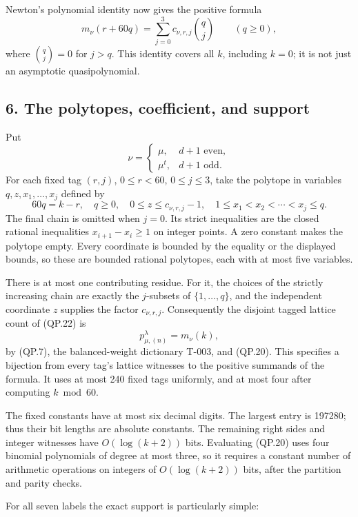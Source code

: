 \documentclass[
  10pt,
]{article}
\begin{document}
Newton's polynomial identity now gives the positive formula \[
\boxed{
m_\nu(r+60q)=\sum_{j=0}^3 c_{\nu,r,j}\binom qj
\qquad(q\ge0),}
\tag{QP.20}
\] where \(\binom qj=0\) for \(j>q\). This identity covers all \(k\),
including \(k=0\); it is not just an asymptotic quasipolynomial.

\subsection{6. The polytopes, coefficient, and
support}\label{the-polytopes-coefficient-and-support}

Put \[
\nu=\begin{cases}\mu,&d+1\text{ even},\\\mu^t,&d+1\text{ odd}.
\end{cases}
\tag{QP.21}
\] For each fixed tag \((r,j)\), \(0\le r<60\), \(0\le j\le3\), take the
polytope in variables \(q,z,x_1,\ldots,x_j\) defined by \[
\boxed{
60q=k-r,\quad q\ge0,\quad
0\le z\le c_{\nu,r,j}-1,\quad
1\le x_1<x_2<\cdots<x_j\le q.}
\tag{QP.22}
\] The final chain is omitted when \(j=0\). Its strict inequalities are
the closed rational inequalities \(x_{i+1}-x_i\ge1\) on integer points.
A zero constant makes the polytope empty. Every coordinate is bounded by
the equality or the displayed bounds, so these are bounded rational
polytopes, each with at most five variables.

There is at most one contributing residue. For it, the choices of the
strictly increasing chain are exactly the \(j\)-subsets of
\(\{1,\ldots,q\}\), and the independent coordinate \(z\) supplies the
factor \(c_{\nu,r,j}\). Consequently the disjoint tagged lattice count
of (QP.22) is \[
\boxed{p_{\mu,(n)}^\lambda=m_\nu(k),}
\tag{QP.23}
\] by (QP.7), the balanced-weight dictionary T-003, and (QP.20). This
specifies a bijection from every tag's lattice witnesses to the positive
summands of the formula. It uses at most 240 fixed tags uniformly, and
at most four after computing \(k\bmod60\).

The fixed constants have at most six decimal digits. The largest entry
is 197280; thus their bit lengths are absolute constants. The remaining
right sides and integer witnesses have \(O(\log(k+2))\) bits. Evaluating
(QP.20) uses four binomial polynomials of degree at most three, so it
requires a constant number of arithmetic operations on integers of
\(O(\log(k+2))\) bits, after the partition and parity checks.

For all seven labels the exact support is particularly simple:
\end{document}
